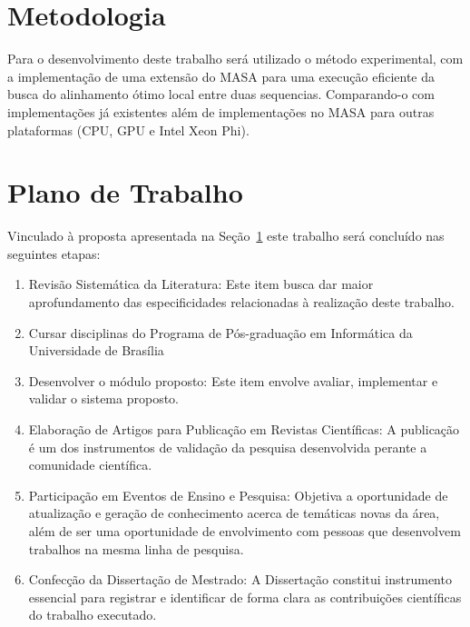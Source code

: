 \documentclass[12pt, a4paper]{article}
\numberwithin{table}{section}
\begin{document}
\section{Metodologia}
\label{sec:metodologia}

Para o desenvolvimento deste trabalho será utilizado o método experimental, 
com a implementação de uma extensão do MASA para uma execução eficiente 
da busca do alinhamento ótimo local entre duas sequencias. 
Comparando-o com implementações já existentes
além de implementações no MASA para outras plataformas (CPU, GPU e Intel Xeon Phi).

\section{Plano de Trabalho}
\label{sec:plano}

Vinculado à proposta apresentada na Seção~\ref{sec:metodologia} este trabalho 
será concluído nas seguintes etapas:

\begin{enumerate}
	\item Revisão Sistemática da Literatura: Este item busca dar maior aprofundamento
		das especificidades relacionadas à realização deste trabalho.
	\item Cursar disciplinas do Programa de Pós-graduação em Informática da Universidade
		de Brasília
	\item Desenvolver o módulo proposto: Este item envolve avaliar, implementar e validar
		o sistema proposto.
	\item Elaboração de Artigos para Publicação em Revistas Científicas: A
			publicação é um dos instrumentos de validação da pesquisa desenvolvida
			perante a comunidade científica.
	\item Participação em Eventos de Ensino e Pesquisa: Objetiva a oportunidade de
			atualização e geração de conhecimento acerca de temáticas novas da área,
			além de ser uma oportunidade de envolvimento com pessoas que desenvolvem
			trabalhos na mesma linha de pesquisa.
	\item Confecção da Dissertação de Mestrado: A Dissertação constitui instrumento essencial
			para registrar e identificar de forma clara as contribuições científicas do
			trabalho executado.
\end{enumerate}
\end{document}

